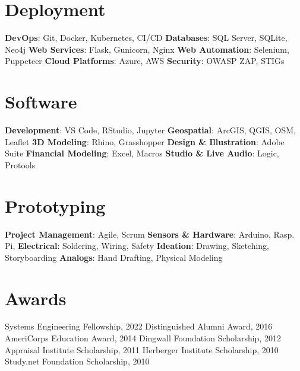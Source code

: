 \documentclass{article}
\begin{document}
\begin{bgbox}[
        height = \paperheight,
        width = 0.3\textwidth,
        colback = gray
    ]
{            \section*{Deployment}
                \textbf{DevOps}: Git, Docker, Kubernetes, CI/CD \newline
                \textbf{Databases}: SQL Server, SQLite, Neo4j\newline
                \textbf{Web Services}: Flask, Gunicorn, Nginx\newline
                \textbf{Web Automation}: Selenium, Puppeteer\newline
                \textbf{Cloud Platforms}: Azure, AWS\newline
                \textbf{Security}: OWASP ZAP, STIGs
            \section*{Software}
                \textbf{Development}: VS Code, RStudio, Jupyter\newline
                \textbf{Geospatial}: ArcGIS, QGIS, OSM, Leaflet\newline
                \textbf{3D Modeling}: Rhino, Grasshopper\newline
                \textbf{Design \& Illustration}: Adobe Suite\newline
                \textbf{Financial Modeling}: Excel, Macros\newline
                \textbf{Studio \& Live Audio}: Logic, Protools
            \section*{Prototyping}
                \textbf{Project Management}: Agile, Scrum\newline
                \textbf{Sensors \& Hardware}: Arduino, Rasp. Pi,\newline
                \textbf{Electrical}: Soldering, Wiring, Safety\newline
                \textbf{Ideation}: Drawing, Sketching, Storyboarding\newline
                \textbf{Analogs}: Hand Drafting, Physical Modeling
            \section*{Awards}
                Systems Engineering Fellowship, 2022\newline
                Distinguished Alumni Award, 2016\newline
                AmeriCorps Education Award, 2014\newline
                Dingwall Foundation Scholarship, 2012\newline
                Appraisal Institute Scholarship, 2011\newline
                Herberger Institute Scholarship, 2010\newline
                Study.net Foundation Scholarship, 2010 
        }
    \end{bgbox}
\end{document}
